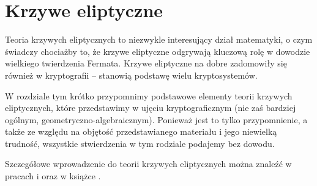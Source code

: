 \chapter{Krzywe eliptyczne}

\noindent
Teoria krzywych eliptycznych to niezwykle interesujący dział matematyki,
o czym świadczy chociażby to,
że krzywe eliptyczne odgrywają kluczową rolę
w dowodzie wielkiego twierdzenia Fermata.
Krzywe eliptyczne na dobre zadomowiły się również w kryptografii --
stanowią podstawę wielu kryptosystemów.

\noindent
W rozdziale tym krótko przypomnimy
podstawowe elementy teorii krzywych eliptycznych,
które przedstawimy w ujęciu kryptograficznym
(nie zaś bardziej ogólnym, geometryczno-algebraicznym).
Ponieważ jest to tylko przypomnienie,
a także ze względu na objętość przedstawianego materiału
i jego niewielką trudność,
wszystkie stwierdzenia w tym rodziale podajemy bez dowodu.

\noindent
Szczegółowe wprowadzenie do teorii krzywych eliptycznych
można znaleźć w pracach \cite{ecintro1} i \cite{ecintro2}
oraz w książce \cite{silverman}.






